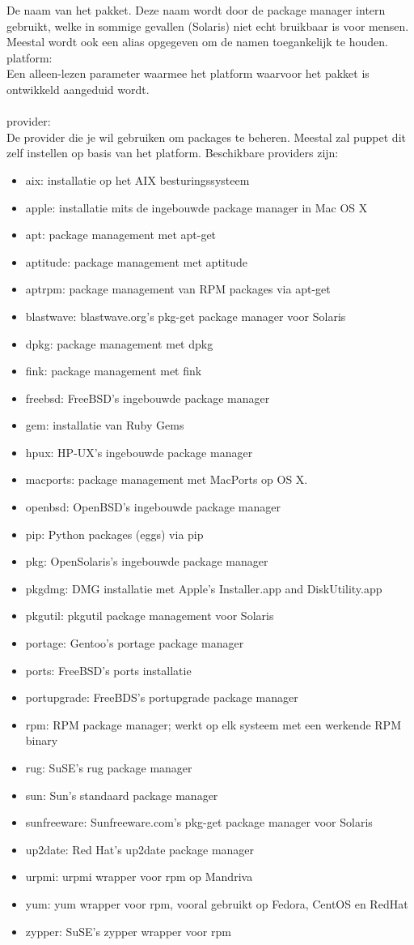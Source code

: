 De naam van het pakket. Deze naam wordt door de package manager intern gebruikt, welke in sommige gevallen (Solaris) niet echt bruikbaar is voor mensen. Meestal wordt ook een alias opgegeven om de namen toegankelijk te houden.
%
platform:\\
Een alleen-lezen parameter waarmee het platform waarvoor het pakket is ontwikkeld aangeduid wordt.\\\\
%
provider:\\
De provider die je wil gebruiken om packages te beheren. Meestal zal puppet dit zelf instellen op basis van het platform. Beschikbare providers zijn:
\begin{itemize}
\item aix: installatie op het AIX besturingssysteem
\item apple: installatie mits de ingebouwde package manager in Mac OS X
\item apt: package management met apt-get
\item aptitude: package management met aptitude
\item aptrpm: package management van RPM packages via apt-get
\item blastwave: blastwave.org's pkg-get package manager voor Solaris
\item dpkg: package management met dpkg
\item fink: package management met fink
\item freebsd: FreeBSD's ingebouwde package manager
\item gem: installatie van Ruby Gems
\item hpux: HP-UX's ingebouwde package manager
\item macports: package management met MacPorts op OS X.
\item openbsd: OpenBSD's ingebouwde package manager
\item pip: Python packages (eggs) via pip
\item pkg: OpenSolaris's ingebouwde package manager
\item pkgdmg: DMG installatie met Apple's Installer.app and DiskUtility.app
\item pkgutil: pkgutil package management voor Solaris
\item portage: Gentoo's portage package manager
\item ports: FreeBSD's ports installatie
\item portupgrade: FreeBDS's portupgrade package manager
\item rpm: RPM package manager; werkt op elk systeem met een werkende RPM binary
\item rug: SuSE's rug package manager
\item sun: Sun's standaard package manager
\item sunfreeware: Sunfreeware.com's pkg-get package manager voor Solaris
\item up2date: Red Hat's up2date package manager
\item urpmi: urpmi wrapper voor rpm op Mandriva
\item yum: yum wrapper voor rpm, vooral gebruikt op Fedora, CentOS en RedHat
\item zypper: SuSE's zypper wrapper voor rpm
\end{itemize}
